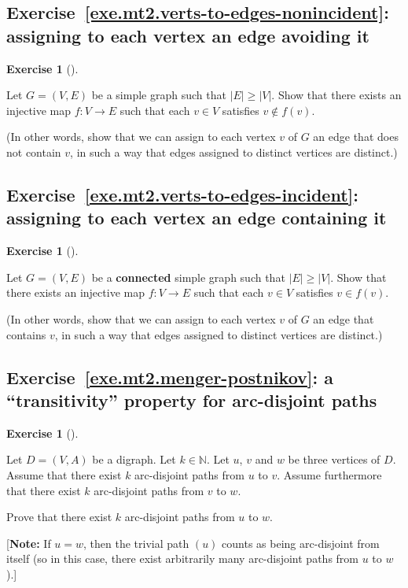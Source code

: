 \documentclass[numbers=enddot,12pt,final,onecolumn,notitlepage]{scrartcl}%
\newcounter{exer}
\theoremstyle{definition}
\newtheorem{exmp}[exer]{Exercise}
\newenvironment{exercise}[1][]
{\begin{exmp}[#1]\begin{leftbar}}
{\end{leftbar}\end{exmp}}
\newcommand{\NN}{\mathbb{N}}
\newcommand{\abs}[1]{\left| #1 \right|}
\newcommand{\tup}[1]{\left( #1 \right)}
\begin{document}
\subsection{Exercise~\ref{exe.mt2.verts-to-edges-nonincident}:
assigning to each vertex an edge avoiding it}

\begin{exercise} \label{exe.mt2.verts-to-edges-nonincident}
Let $G = \tup{V, E}$ be a simple graph such that
$\abs{E} \geq \abs{V}$.
Show that there exists an injective map $f : V \to E$ such that each
$v \in V$ satisfies $v \notin f\tup{v}$.

(In other words, show that we can assign to each vertex $v$ of $G$
an edge that does not contain $v$, in such a way that edges assigned
to distinct vertices are distinct.)
\end{exercise}

\subsection{Exercise~\ref{exe.mt2.verts-to-edges-incident}:
assigning to each vertex an edge containing it}

\begin{exercise} \label{exe.mt2.verts-to-edges-incident}
Let $G = \tup{V, E}$ be a \textbf{connected} simple graph such that
$\abs{E} \geq \abs{V}$.
Show that there exists an injective map $f : V \to E$ such that each
$v \in V$ satisfies $v \in f\tup{v}$.

(In other words, show that we can assign to each vertex $v$ of $G$
an edge that contains $v$, in such a way that edges assigned
to distinct vertices are distinct.)
\end{exercise}

\subsection{Exercise~\ref{exe.mt2.menger-postnikov}:
a ``transitivity'' property for arc-disjoint paths}

\begin{exercise} \label{exe.mt2.menger-postnikov}
Let $D = \tup{V, A}$ be a digraph.
Let $k \in \NN$.
Let $u$, $v$ and $w$ be three vertices of $D$.
Assume that there exist $k$ arc-disjoint paths from $u$ to $v$.
Assume furthermore that there exist $k$ arc-disjoint paths from $v$
to $w$.

Prove that there exist $k$ arc-disjoint paths from $u$ to $w$.

[\textbf{Note:} If $u = w$, then the trivial path $\tup{u}$ counts as
being arc-disjoint from itself (so in this case, there exist
arbitrarily many arc-disjoint paths from $u$ to $w$).]
\end{exercise}
\end{document}
